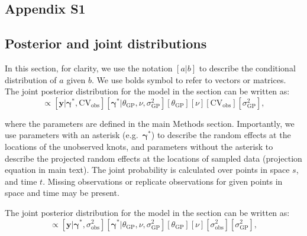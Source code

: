 \documentclass[12pt,english]{article}
\begin{document}
\begin{spacing}{1.4}

\clearpage

\setcounter{section}{0}
\section{Appendix S1}

\linenumbers

\subsection{Posterior and joint distributions}

In this section, for clarity, we use the notation $[a|b]$ to describe the
conditional distribution of $a$ given $b$. We use bolds symbol to refer to vectors or matrices.
The joint posterior distribution for
the model in the section \textit{} can be written
as:
\begin{equation}
  [
  \bm{\gamma}^*,
  \theta_{\mathrm{GP}},
  \nu,
  \mathrm{CV}_\mathrm{obs},
  \sigma_{\mathrm{GP}}^2
  |
  \bm{y}]
  \propto
  [\bm{y} | \bm{\gamma}^*, \mathrm{CV}_\mathrm{obs}]
  [\bm{\gamma}^* | \theta_{\mathrm{GP}}, \nu, \sigma_{\mathrm{GP}}^2]
  [\theta_{\mathrm{GP}}]
  [\nu]
  [\mathrm{CV}_\mathrm{obs}]
  [\sigma_{\mathrm{GP}}^2],
\end{equation}

\noindent where the parameters are defined in the main Methods section.
Importantly, we use parameters with an asterisk (e.g.\ $\bm{\gamma}^*$) to describe
the random effects at the locations of the unobserved knots, and parameters
without the asterisk to describe the projected random effects
at the locations of sampled data (projection equation in main text). The joint
probability is calculated over points in space $s$, and time $t$. Missing
observations or replicate observations for given points in space and time may be
present.

The joint posterior distribution for the model in the section
\textit{} can be written as:
\begin{equation}
  [
  \bm{\gamma}^*,
  \theta_{\mathrm{GP}},
  \nu,
  \sigma^2_{\mathrm{obs}},
  \sigma_{\mathrm{GP}}^2
  |
  \bm{y}]
  \propto
  [\bm{y} | \bm{\gamma}^*, \sigma^2_{\mathrm{obs}}]
  [\bm{\gamma}^* | \theta_{\mathrm{GP}}, \nu, \sigma_{\mathrm{GP}}^2]
  [\theta_{\mathrm{GP}}]
  [\nu]
  [\sigma^2_{\mathrm{obs}}]
  [\sigma_{\mathrm{GP}}^2],
\end{equation}


\end{spacing}
\end{document}
